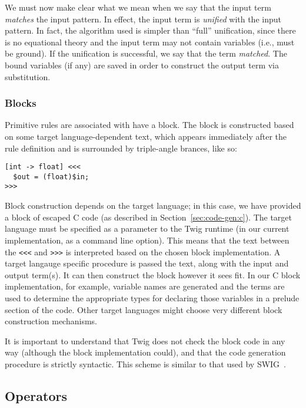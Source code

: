 We must now make clear what we mean when we say that the input term \emph{matches} the input pattern. In effect, the input term is \emph{unified}\cite{baader98rewriting} with the input pattern. In fact, the algorithm used is simpler than ``full'' unification, since there is no equational theory and the input term may not contain variables (i.e., must be ground). If the unification is successful, we say that the term \emph{matched}. The bound variables (if any) are saved in order to construct the output term via substitution.


\subsubsection{Blocks}

Primitive rules are associated with have a block. The block is constructed based on some target language-dependent text, which appears immediately after the rule definition and is surrounded by triple-angle brances, like so:

\begin{verbatim}
[int -> float] <<<
  $out = (float)$in;
>>>
\end{verbatim}

Block construction depends on the target language; in this case, we have provided a block of escaped C code (as described in Section~\ref{sec:code-gen:c}). The target language must be specified as a parameter to the Twig runtime (in our current implementation, as a command line option). This means that the text between the \verb|<<<| and \verb|>>>| is interpreted based on the chosen block implementation. A target langauge specific procedure is passed the text, along with the input and output term(s). It can then construct the block however it sees fit. In our C block implementation, for example, variable names are generated and the terms are used to determine the appropriate types for declaring those variables in a prelude section of the code. Other target languages might choose very different block construction mechanisms.

It is important to understand that Twig does not check the block code in any way (although the block implementation could), and that the code generation procedure is strictly syntactic. This scheme is similar to that used by SWIG~\cite{swig}.

\subsection{Operators}

